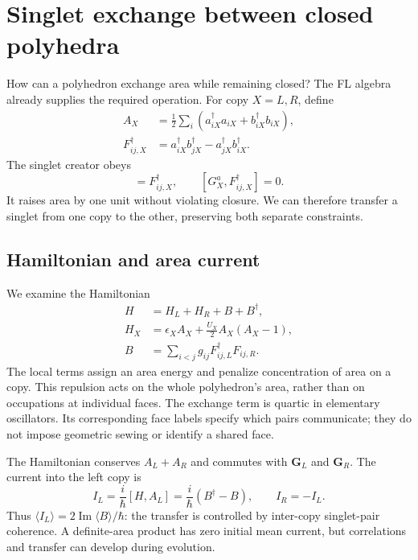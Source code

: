 \documentclass[twocolumn,draft,aps,nofootinbib,nobibnotes,final]{revtex4-2}
\begin{document}
\section{Singlet exchange between closed polyhedra}\label{sec:singlet-exchange}

How can a polyhedron exchange area while remaining closed? The FL algebra already supplies the required operation. For copy $X=L,R$, define
\begin{equation}
\begin{aligned}
 A_X&=\frac12\sum_i(a_{iX}^{\dagger}a_{iX}+b_{iX}^{\dagger}b_{iX}),\\
 F_{ij,X}^{\dagger}&=a_{iX}^{\dagger}b_{jX}^{\dagger}
 -a_{jX}^{\dagger}b_{iX}^{\dagger}.
\end{aligned}
\end{equation}
The singlet creator obeys
\begin{equation}
 [A_X,F_{ij,X}^{\dagger}]=F_{ij,X}^{\dagger},\qquad
 [G_X^a,F_{ij,X}^{\dagger}]=0.
\end{equation}
It raises area by one unit without violating closure. We can therefore transfer a singlet from one copy to the other, preserving both separate constraints.

\subsection{Hamiltonian and area current}

We examine the Hamiltonian
\begin{equation}\label{eqn:singlet-exchange-hamiltonian}
\begin{aligned}
 H&=H_L+H_R+B+B^{\dagger},\\
 H_X&=\epsilon_X A_X+\frac{U_X}{2}A_X(A_X-1),\\
 B&=\sum_{i<j}g_{ij}F_{ij,L}^{\dagger}F_{ij,R}.
\end{aligned}
\end{equation}
The local terms assign an area energy and penalize concentration of area on a copy. This repulsion acts on the whole polyhedron's area, rather than on occupations at individual faces. The exchange term is quartic in elementary oscillators. Its corresponding face labels specify which pairs communicate; they do not impose geometric sewing or identify a shared face.

The Hamiltonian conserves $A_L+A_R$ and commutes with $\boldsymbol G_L$ and $\boldsymbol G_R$. The current into the left copy is
\begin{equation}\label{eqn:singlet-area-current}
 I_L=\frac{i}{\hbar}[H,A_L]
 =\frac{i}{\hbar}(B^{\dagger}-B),\qquad I_R=-I_L.
\end{equation}
Thus $\langle I_L\rangle=2\operatorname{Im}\langle B\rangle/\hbar$: the transfer is controlled by inter-copy singlet-pair coherence. A definite-area product has zero initial mean current, but correlations and transfer can develop during evolution.
\end{document}
